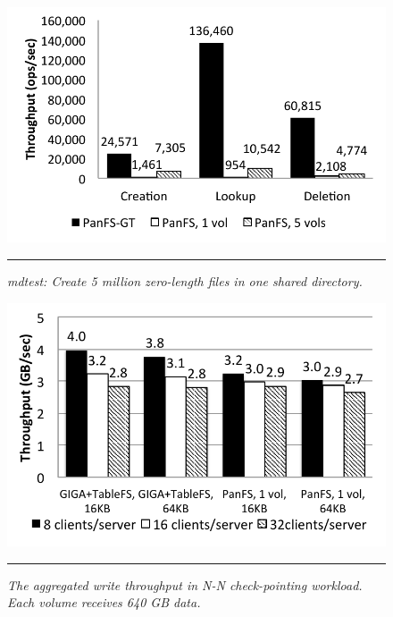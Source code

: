 \begin{figure}[t]  %
\centerline{\includegraphics[scale=0.6]{./figs/mdtest}}
\vspace{10pt}
\caption{\normalsize
\textit{mdtest:
Create 5 million zero-length files in one shared directory.
}
}
\vspace{10pt}
\hrule
\label{graph:ldb-singlenode}
\end{figure}       %

\begin{figure}[t]  %
\centerline{\includegraphics[scale=0.6]{./figs/checkpointing_write}}
\vspace{10pt}
\caption{\normalsize
\textit{
The aggregated write throughput in N-N check-pointing workload.
Each volume receives 640 GB data.
}
}
\vspace{10pt}
\hrule
\label{graph:ldb-singlenode}
\end{figure}       %

